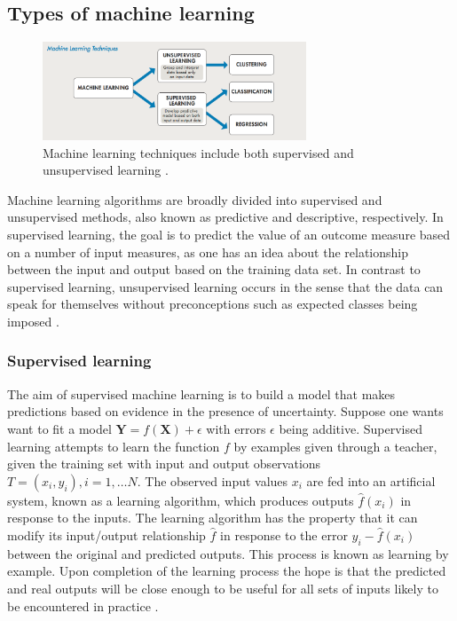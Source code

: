 \subsection{Types of machine learning}

\begin{figure}[H]
  \centering
    \includegraphics[width=0.7\textwidth]{images/Ml_techs.png}
    \caption{Machine learning techniques include both supervised and unsupervised learning \citep{Machinelearning}.}
  \label{sup-unsup}
\end{figure}

Machine learning algorithms are broadly divided into supervised and unsupervised methods, also known as predictive and descriptive, respectively. In supervised learning, the goal is to predict the value of an outcome measure based on a number of input measures, as one has an idea about the relationship between the input and output based on the training data set. In contrast to supervised learning, unsupervised learning occurs in the sense that the data can speak for themselves
without preconceptions such as expected classes being imposed \citep{ball2010data}. 

\subsubsection{Supervised learning}
The aim of supervised machine learning is to build a model
that makes predictions based on evidence in the presence of
uncertainty. Suppose  one wants want to fit a model $\textbf{Y}=f(\textbf{X})+\epsilon$ with errors $\epsilon$ being additive. Supervised learning attempts to learn the function $f$ by examples given through a teacher, given the training set with input and output observations $T=(x_i,y_i ), i=1,\dots N$. The observed input values $x_i$ are fed into an artificial system, known as a learning algorithm, which produces outputs $\widehat{f}(x_i)$ in response to the inputs. The learning algorithm has the property that it can modify its input/output relationship $\widehat{f}$ in response to the error $y_i- \widehat{f} (x_i)$ between the original and predicted outputs. This process is known as learning by example. Upon completion of the learning process the hope is that the predicted and real outputs will be close enough to be useful for all sets of inputs likely to be encountered in practice \citep{friedman2001elements}.

